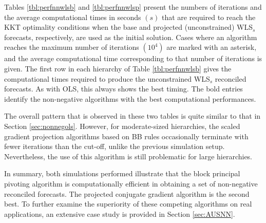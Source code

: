 \documentclass[11pt]{article}
\newcommand{\0}{\phantom{0}}
\begin{document}
Tables \ref{tbl:perfnnwlsb} and \ref{tbl:perfnnwlsp} present the numbers of iterations and the average computational times in seconds $(s)$ that are required to reach the KKT optimality conditions when the base and projected (unconstrained) WLS$_{s}$ forecasts, respectively, are used as the initial solution. Cases where an algorithm reaches the maximum number of iterations $(10^{4})$ are marked with an asterisk, and the average computational time corresponding to that number of iterations is given. The first row in each hierarchy of Table \ref{tbl:perfnnwlsb} gives the computational times required to produce the unconstrained WLS$_{s}$ reconciled forecasts. As with OLS, this always shows the best timing. The bold entries identify the non-negative algorithms with the best computational performances. 

The overall pattern that is observed in these two tables is quite similar to that in Section \ref{sec:nonnegols}. However, for moderate-sized hierarchies, the scaled gradient projection algorithms based on BB rules occasionally terminate with fewer iterations than the cut-off, unlike the previous simulation setup. Nevertheless, the use of this algorithm is still problematic for  large hierarchies.

In summary, both simulations performed illustrate that the block principal pivoting algorithm is computationally efficient in obtaining a set of non-negative reconciled forecasts. The projected conjugate gradient algorithm is the second best. To further examine the superiority of these competing algorithms on real applications, an extensive case study is provided in Section \ref{sec:AUSNN}.
\end{document}
